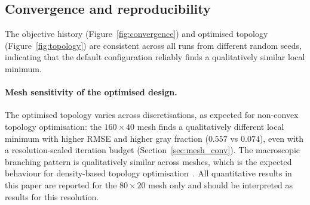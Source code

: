 \subsection{Convergence and reproducibility}
\label{sec:convergence}

The objective history (Figure~\ref{fig:convergence}) and optimised
topology (Figure~\ref{fig:topology}) are consistent across all runs
from different random seeds, indicating that the default configuration
reliably finds a qualitatively similar local minimum.

\paragraph{Mesh sensitivity of the optimised design.}
The optimised topology varies across discretisations,
as expected for non-convex topology optimisation:
the $160\times40$ mesh finds a qualitatively different local minimum
with higher RMSE and higher gray fraction ($0.557$ vs $0.074$),
even with a resolution-scaled iteration budget
(Section~\ref{sec:mesh_conv}).
The macroscopic branching pattern is qualitatively similar
across meshes, which is the expected behaviour
for density-based topology optimisation~\cite{lazarov2016}.
All quantitative results in this paper are reported for the
$80\times20$ mesh only and should be interpreted as
results for this resolution.